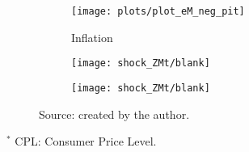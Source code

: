 \documentclass[../thesis.tex]{subfiles}
\begin{document}
\begin{figure}[h!]
\begin{subfigure}[b]{0.27\textwidth}
		\centering
		\texttt{[image: plots/plot\_eM\_neg\_pit]}
		\caption{\scriptsize Inflation}
		\label{fig:eM-neg-pit}
	\end{subfigure}
	\hspace*{0.5cm}
	\begin{subfigure}[b]{0.27\textwidth}
		\centering
		\texttt{[image: shock\_ZMt/blank]}
	\end{subfigure}
	\hspace*{0.5cm}
	\begin{subfigure}[b]{0.27\textwidth}
		\centering
		\texttt{[image: shock\_ZMt/blank]}
	\end{subfigure}
	\caption*{Source: created by the author.}
	\label{fig:eM-neg-irf2}
\end{figure}

$^{\ast}$ CPL: Consumer Price Level.


\newpage

\end{document}
